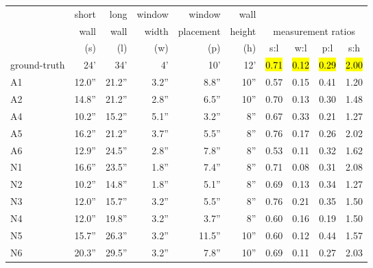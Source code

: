 \begin{table}[tbp]
\vspace{-0.1in}
\begin{center}
\begin{footnotesize}
\begin{tabular}{@{}l@{~~}|@{~~}r@{~~~}r@{~~~}r@{~~~}r@{~~~}r@{~~}|@{~~}c@{~~~}c@{~~~}c@{~~~}c@{}} 
~       &  {\tiny short}   & {\tiny long}    & {\tiny window}  & {\tiny window} &  {\tiny wall}      &  & & & \\
~       &  {\tiny wall}    & {\tiny wall}     & {\tiny width}   & {\tiny placement} &  {\tiny height}  &  \multicolumn{4}{c}{{\tiny measurement ratios}} \\ 
~       &  (s)     &  (l)     & (w)     & (p)     &  (h)  &  s:l  &  w:l  &  p:l & s:h \\ \hline
{\tiny ground-truth}  &  24'     &  34'     &  4'     &  10'    &   12'   &\hl{0.71} &\hl{0.12} &\hl{0.29} &\hl{2.00} \\ 
\hline
A1      &  12.0''  &  21.2''  &  3.2''  &  8.8''  &   10''  &  0.57    &  0.15    &  0.41  &  1.20 \\ 
A2      &  14.8''  &  21.2''  &  2.8''  &  6.5''  &   10''  &  0.70    &  0.13    &  0.30  &  1.48 \\ 
A4      &  10.2''  &  15.2''  &  5.1''  &  3.2''  &    8''  &  0.67    &  0.33    &  0.21  &  1.27 \\ 
A5      &  16.2''  &  21.2''  &  3.7''  &  5.5''  &    8''  &  0.76    &  0.17    &  0.26  &  2.02 \\ 
A6      &  12.9''  &  24.5''  &  2.8''  &  7.8''  &    8''  &  0.53    &  0.11    &  0.32  &  1.62 \\ 
N1      &  16.6''  &  23.5''  &  1.8''  &  7.4''  &    8''  &  0.71    &  0.08    &  0.31  &  2.08 \\ 
N2      &  10.2''  &  14.8''  &  1.8''  &  5.1''  &    8''  &  0.69    &  0.13    &  0.34  &  1.27 \\ 
N3      &  12.0''  &  15.7''  &  3.2''  &  5.5''  &    8''  &  0.76    &  0.21    &  0.35  &  1.50 \\ 
N4      &  12.0''  &  19.8''  &  3.2''  &  3.7''  &    8''  &  0.60    &  0.16    &  0.19  &  1.50 \\ 
N5      &  15.7''  &  26.3''  &  3.2''  & 11.5''  &   10''  &  0.60    &  0.12    &  0.44  &  1.57 \\ 
N6      &  20.3''  &  29.5''  &  3.2''  &  7.8''  &   10''  &  0.69    &  0.11    &  0.27  &  2.03 \\ 

\end{tabular}
\end{footnotesize}
\end{center}
\end{table}

